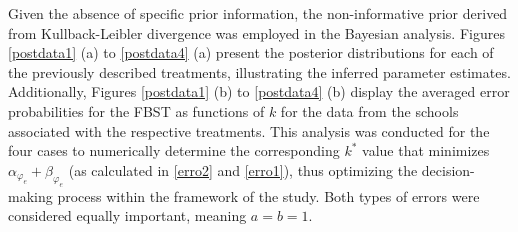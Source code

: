\documentclass[AMA,Times1COL]{WileyNJDv5} %
\begin{document}
Given the absence of specific prior information, the non-informative prior derived from Kullback-Leibler divergence was employed in the Bayesian analysis. Figures \ref{postdata1} (a) to \ref{postdata4}  (a) present the posterior distributions for each of the previously described treatments, illustrating the inferred parameter estimates. Additionally, Figures \ref{postdata1} (b) to \ref{postdata4} (b) display the averaged error probabilities for the FBST as functions of $k$ for the data from the schools associated with the respective treatments. This analysis was conducted for the four cases to numerically determine the corresponding $k^*$ value that minimizes $\alpha_{\varphi_e} + \beta_{\varphi_e}$ (as calculated in \ref{erro2} and \ref{erro1}), thus optimizing the decision-making process within the framework of the study. Both types of errors were considered equally important, meaning $a = b = 1$.  




\end{document}
